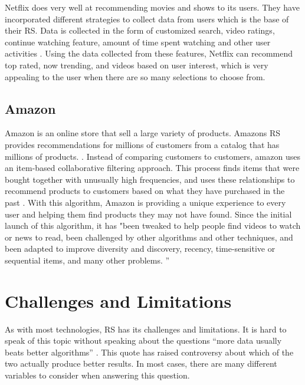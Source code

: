 \documentclass[sigconf]{acmart}
\begin{document}
Netflix does very well at recommending movies and shows to its users. They have incorporated different
strategies to collect data from users which is the base of their RS. Data is collected in the form of
customized search, video ratings, continue watching feature, amount of time spent watching and other user
activities \cite{Gomez-Uribe2015}. Using the data collected from these features, Netflix can recommend top
rated, now trending, and videos based on user interest, which is very appealing to the user when there are so
many selections to choose from.

\subsection{Amazon}
Amazon is an online store that sell a large variety of products. Amazons RS provides recommendations for
millions of customers from a catalog that has millions of products. \cite{Smith2017}. Instead of comparing
customers to customers, amazon uses an item-based collaborative filtering approach. This process finds items
that were bought together with unusually high frequencies, and uses these relationships to recommend products
to customers based on what they have purchased in the past \cite{Smith2017}. With this algorithm, Amazon is
providing a unique experience to every user and helping them find products they may not have found. Since the
initial launch of this algorithm, it has "been tweaked to help people find videos to watch or news to read,
been challenged by other algorithms and other techniques, and been adapted to improve diversity and discovery,
recency, time-sensitive or sequential items, and many other problems. '' \cite{Smith2017}

\section{Challenges and Limitations}
As with most technologies, RS has its challenges and limitations. It is hard to speak of this topic without
speaking about the questions ``more data usually beats better algorithms'' \cite{Rajaraman2008}. This quote has
raised controversy about which of the two actually produce better results. In most cases, there are many
different variables to consider when answering this question. 
\end{document}
